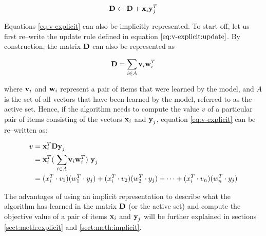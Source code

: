\begin{equation} \label{eq:v-explicit:update}
  \boldsymbol{\mathbf{D}} \gets \boldsymbol{\mathbf{D}} + \boldsymbol{\mathbf{x}}_i \boldsymbol{\mathbf{y}}_{j}^{T}  
\end{equation}

Equations \ref{eq:v-explicit} can also be implicitly represented. To start off, let us first re--write the update rule defined in equation $\ref{eq:v-explicit:update}$. By construction, the matrix $\boldsymbol{\mathbf{D}}$ can also be represented as

\begin{equation} \nonumber
    \boldsymbol{\mathbf{D}} = \sum_{i \in A} \boldsymbol{\mathbf{v}}_i \boldsymbol{\mathbf{w}}_i^T
\end{equation}

where $\boldsymbol{\mathbf{v}}_i$ and $\boldsymbol{\mathbf{w}}_i$ represent a pair of items that were learned by the model, and $A$ is the set of all vectors that have been learned by the model, referred to as the active set. Hence, if the algorithm needs to compute the value $v$ of a particular pair of items consisting of the vectors $\boldsymbol{\mathbf{x}}_i$ and $\boldsymbol{\mathbf{y}}_j$, equation \ref{eq:v-explicit} can be re--written as:

\begin{equation} \label{eq:v-implicit}
    \begin{split}
        v &= \vect{x}_i^T \vect{D} \vect{y}_j \\
        &= \vect{x}_i^T (\ \sum_{i \in A} \vect{v}_i \vect{w}_i^T )\ \vect{y}_j \\
        &= ( x_i^T \cdot v_1 )  ( w_1^T \cdot y_j ) + ( x_i^T \cdot v_2 ) ( w_2^T  \cdot y_j ) + \cdots + ( x_i^T \cdot v_n )  ( w_n^T \cdot y_j ) \\
    \end{split}
\end{equation}

The advantages of using an implicit representation to describe what the \mlblink algorithm has learned in the matrix $\boldsymbol{\mathbf{D}}$ (or the active set) and compute the objective value of a pair of items $\boldsymbol{\mathbf{x}}_i$ and $\boldsymbol{\mathbf{y}}_j$ will be further explained in sections \ref{sect:meth:explicit} and \ref{sect:meth:implicit}.